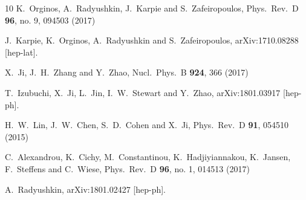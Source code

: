 \documentclass[final,5p,times,twocolumn]{elsarticle}
\begin{document}
\begin{thebibliography}{10}
  K.~Orginos, A.~Radyushkin, J.~Karpie and S.~Zafeiropoulos,
  Phys.\ Rev.\ D {\bf 96}, no. 9, 094503 (2017)

  J.~Karpie, K.~Orginos, A.~Radyushkin and S.~Zafeiropoulos,
  arXiv:1710.08288 [hep-lat].

  X.~Ji, J.~H.~Zhang and Y.~Zhao,
  Nucl.\ Phys.\ B {\bf 924}, 366 (2017)


  T.~Izubuchi, X.~Ji, L.~Jin, I.~W.~Stewart and Y.~Zhao,
  arXiv:1801.03917 [hep-ph].


  H.~W.~Lin, J.~W.~Chen, S.~D.~Cohen and X.~Ji,
  Phys.\ Rev.\ D {\bf 91}, 054510 (2015)


  C.~Alexandrou, K.~Cichy, M.~Constantinou, K.~Hadjiyiannakou, K.~Jansen, F.~Steffens and C.~Wiese,
  Phys.\ Rev.\ D {\bf 96}, no. 1, 014513 (2017)


  A.~Radyushkin,
  arXiv:1801.02427 [hep-ph].
 
   \end{thebibliography}

 


 
\end{document}

